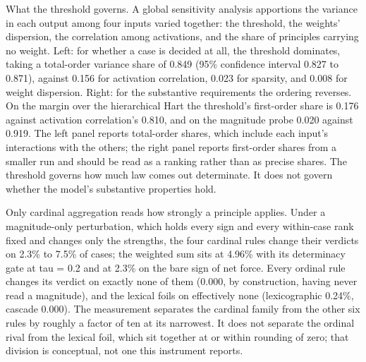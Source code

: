 \caption{What the threshold governs. A global sensitivity analysis apportions the variance in each output among four inputs varied together: the threshold, the weights' dispersion, the correlation among activations, and the share of principles carrying no weight. Left: for whether a case is decided at all, the threshold dominates, taking a total-order variance share of 0.849 (95\% confidence interval 0.827 to 0.871), against 0.156 for activation correlation, 0.023 for sparsity, and 0.008 for weight dispersion. Right: for the substantive requirements the ordering reverses. On the margin over the hierarchical Hart the threshold's first-order share is 0.176 against activation correlation's 0.810, and on the magnitude probe 0.020 against 0.919. The left panel reports total-order shares, which include each input's interactions with the others; the right panel reports first-order shares from a smaller run and should be read as a ranking rather than as precise shares. The threshold governs how much law comes out determinate. It does not govern whether the model's substantive properties hold.}

\caption{Only cardinal aggregation reads how strongly a principle applies. Under a magnitude-only perturbation, which holds every sign and every within-case rank fixed and changes only the strengths, the four cardinal rules change their verdicts on 2.3\% to 7.5\% of cases; the weighted sum sits at 4.96\% with its determinacy gate at tau = 0.2 and at 2.3\% on the bare sign of net force. Every ordinal rule changes its verdict on exactly none of them (0.000, by construction, having never read a magnitude), and the lexical foils on effectively none (lexicographic 0.24\%, cascade 0.000). The measurement separates the cardinal family from the other six rules by roughly a factor of ten at its narrowest. It does not separate the ordinal rival from the lexical foil, which sit together at or within rounding of zero; that division is conceptual, not one this instrument reports.}

